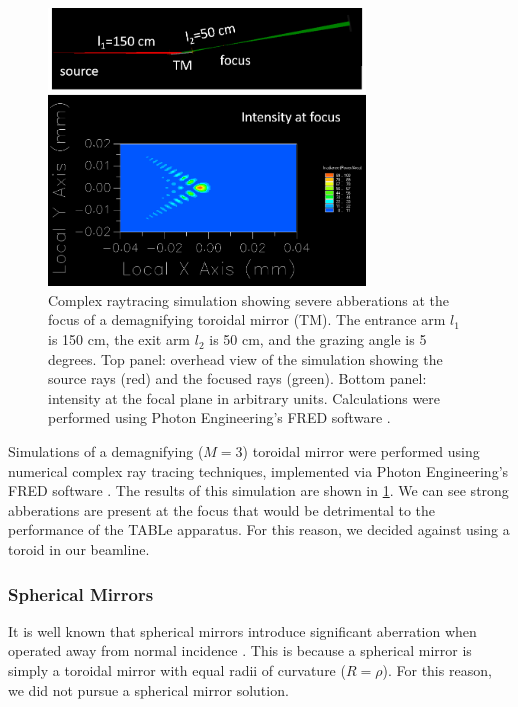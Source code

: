 \begin{figure}
	\centering
	\includegraphics[width=0.75\textwidth]{figures/chap2/TM_coma.png}
	\caption{Complex raytracing simulation showing severe abberations at the focus of a demagnifying toroidal mirror (TM). The entrance arm $l_1$ is 150 cm, the exit arm $l_2$ is 50 cm, and the grazing angle is 5 degrees. Top panel: overhead view of the simulation showing the source rays (red) and the focused rays (green). Bottom panel: intensity at the focal plane in arbitrary units. Calculations were performed using Photon Engineering's FRED software \cite{pfistererFREDOpticalEngineering}.}
	\label{fig:TM_coma}
\end{figure}

Simulations of a demagnifying ($M=3$) toroidal mirror were performed using numerical complex ray tracing techniques, implemented via Photon Engineering's FRED software \cite{pfistererFREDOpticalEngineering,arnaudRepresentationGaussianBeams1985}. The results of this simulation are shown in \cref{fig:TM_coma}. We can see strong abberations are present at the focus that would be detrimental to the performance of the TABLe apparatus. For this reason, we decided against using a toroid in our beamline.

\subsubsection{Spherical Mirrors}

It is well known that spherical mirrors introduce significant aberration when operated away from normal incidence \cite{howellsMirrorsSynchrotronRadiationBeamlines1994}. This is because a spherical mirror is simply a toroidal mirror with equal radii of curvature ($R=\rho$). For this reason, we did not pursue a spherical mirror solution.

